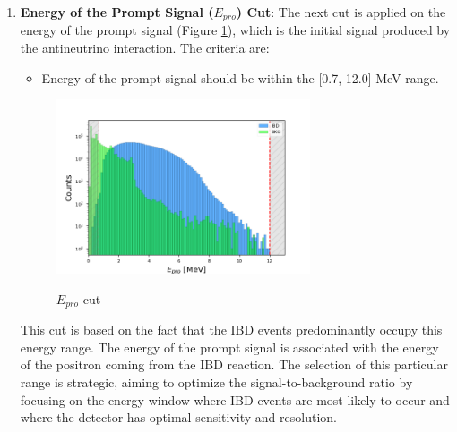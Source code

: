 \begin{enumerate}
	\vspace{-1\baselineskip}

	\item \textbf{Energy of the Prompt Signal ($E_{pro}$) Cut}: The next cut is applied on the energy of the prompt signal (Figure \ref{fig:e_pto_cut}), which is the initial signal produced by the antineutrino interaction. The criteria are:
	\begin{itemize}
		\item Energy of the prompt signal should be within the [0.7, 12.0] MeV range.
	\end{itemize}
	
	\begin{adjustbox}{minipage={\linewidth}, valign=t}
		
		\begin{figure}
			
			\vspace{-1\baselineskip}
			\caption{$E_{pro}$ cut}
			\vspace{-0.5\baselineskip}
			\includegraphics[width=7.5cm]{Images/Cut/e_pro.png}
			\label{fig:e_pto_cut}
			\vspace{-1\baselineskip}
			
		\end{figure}
		
		\vspace*{0.15cm}
		
		This cut is based on the fact that the IBD events predominantly occupy this energy range. The energy of the prompt signal is associated with the energy of the positron coming from the IBD reaction. The selection of this particular range is strategic, aiming to optimize the signal-to-background ratio by focusing on the energy window where IBD events are most likely to occur and where the detector has optimal sensitivity and resolution.
		\\
		
	\end{adjustbox}



\end{enumerate}
